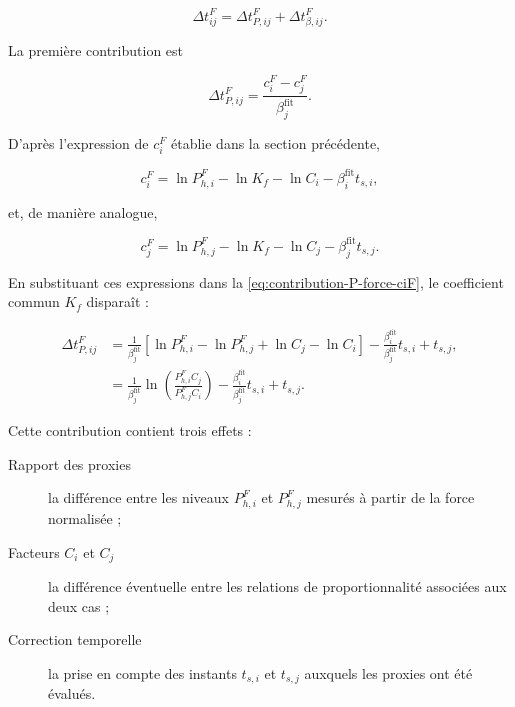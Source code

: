 \documentclass[
    11pt,
    a4paper
]{article}
\begin{document}
\begin{equation}
    \Delta t_{ij}^{F}
    =
    \Delta t_{P,ij}^{F}
    +
    \Delta t_{\beta,ij}^{F}.
    \label{eq:somme-contributions-force}
\end{equation}

La première contribution est

\begin{equation}
    \Delta t_{P,ij}^{F}
    =
    \frac{
        c_i^{F}-c_j^{F}
    }{
        \beta_j^{\mathrm{fit}}
    }.
    \label{eq:contribution-P-force-ciF}
\end{equation}

D’après l’expression de \(c_i^{F}\) établie dans la section précédente,

\begin{equation}
    c_i^{F}
    =
    \ln P_{h,i}^{F}
    -
    \ln K_f
    -
    \ln C_i
    -
    \beta_i^{\mathrm{fit}}t_{s,i},
    \label{eq:ciF-rappel-section7}
\end{equation}

et, de manière analogue,

\begin{equation}
    c_j^{F}
    =
    \ln P_{h,j}^{F}
    -
    \ln K_f
    -
    \ln C_j
    -
    \beta_j^{\mathrm{fit}}t_{s,j}.
    \label{eq:cjF-rappel-section7}
\end{equation}

En substituant ces expressions dans la
\ref{eq:contribution-P-force-ciF}, le coefficient commun \(K_f\) disparaît :

\begin{align}
    \Delta t_{P,ij}^{F}
    &=
    \frac{1}{\beta_j^{\mathrm{fit}}}
    \left[
        \ln P_{h,i}^{F}
        -
        \ln P_{h,j}^{F}
        +
        \ln C_j
        -
        \ln C_i
    \right]
    -
    \frac{\beta_i^{\mathrm{fit}}}
    {\beta_j^{\mathrm{fit}}}
    t_{s,i}
    +
    t_{s,j},
    \nonumber\\
    &=
    \frac{1}{\beta_j^{\mathrm{fit}}}
    \ln\left(
        \frac{
            P_{h,i}^{F}C_j
        }{
            P_{h,j}^{F}C_i
        }
    \right)
    -
    \frac{\beta_i^{\mathrm{fit}}}
    {\beta_j^{\mathrm{fit}}}
    t_{s,i}
    +
    t_{s,j}.
    \label{eq:contribution-P-force}
\end{align}

Cette contribution contient trois effets :

\begin{description}
    \item[Rapport des proxies]
    la différence entre les niveaux \(P_{h,i}^{F}\) et \(P_{h,j}^{F}\) mesurés
    à partir de la force normalisée ;

    \item[Facteurs \(C_i\) et \(C_j\)]
    la différence éventuelle entre les relations de proportionnalité associées
    aux deux cas ;

    \item[Correction temporelle]
    la prise en compte des instants \(t_{s,i}\) et \(t_{s,j}\) auxquels les
    proxies ont été évalués.
\end{description}
\end{document}
